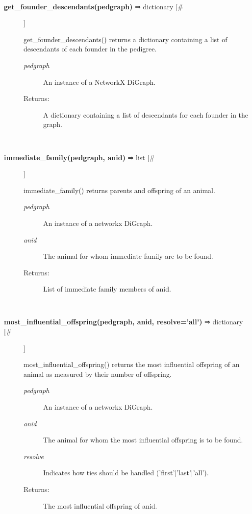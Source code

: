 \documentclass[10pt]{article}
\begin{document}
\begin{description}
\begin{description}
\end{description}
\\ 

\item[\textbf{get\_founder\_descendants(pedgraph)}
 ⇒ dictionary [\#]]

 get\_founder\_descendants() returns a dictionary containing a list of descendants of each founder in the pedigree.
\begin{description}
\item[\emph{pedgraph}
] An instance of a NetworkX DiGraph.
\item[Returns:] A dictionary containing a list of descendants for each founder in the graph.

\end{description}
\\ 

\item[\textbf{immediate\_family(pedgraph, anid)}
 ⇒ list [\#]]

 immediate\_family() returns parents and offspring of an animal.
\begin{description}
\item[\emph{pedgraph}
] An instance of a networkx DiGraph.
\item[\emph{anid}
] The animal for whom immediate family are to be found.
\item[Returns:] List of immediate family members of anid.

\end{description}
\\ 

\item[\textbf{most\_influential\_offspring(pedgraph, anid, resolve='all')}
 ⇒ dictionary [\#]]

 most\_influential\_offspring() returns the most influential offspring of an animal as measured by their number of offspring.
\begin{description}
\item[\emph{pedgraph}
] An instance of a networkx DiGraph.
\item[\emph{anid}
] The animal for whom the most influential offspring is to be found.
\item[\emph{resolve}
] Indicates how ties should be handled ('first'|'last'|'all').
\item[Returns:] The most influential offspring of anid.

\end{description}
\\ 


\end{description}
\end{document}
